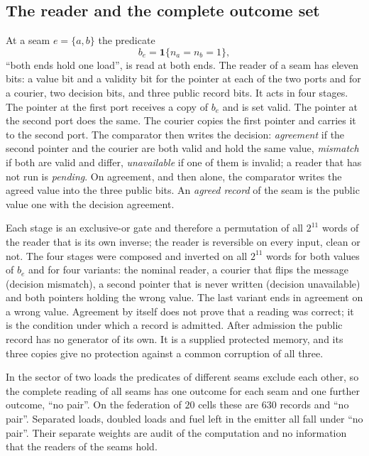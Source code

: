 \documentclass[11pt]{article}
\theoremstyle{definition}
\theoremstyle{remark}
\theoremstyle{plain}
\begin{document}
\subsection{The reader and the complete outcome set}
\label{sec:reader}

At a seam $e=\{a,b\}$ the predicate
\[
b_e=\mathbf 1\{n_a=n_b=1\},
\]
``both ends hold one load'', is read at both ends. The reader of a seam has
eleven bits: a value bit and a validity bit for the pointer at each of the
two ports and for a courier, two decision bits, and three public record
bits. It acts in four stages. The pointer at the first port receives a copy
of $b_e$ and is set valid. The pointer at the second port does the same.
The courier copies the first pointer and carries it to the second port. The
comparator then writes the decision: \emph{agreement} if the second pointer
and the courier are both valid and hold the same value, \emph{mismatch} if
both are valid and differ, \emph{unavailable} if one of them is invalid; a
reader that has not run is \emph{pending}. On agreement,
and then alone, the comparator writes the agreed value into the three
public bits. An \emph{agreed record} of the seam is the public value one
with the decision agreement.

Each stage is an exclusive-or gate and therefore a permutation of all
$2^{11}$ words of the reader that is its own inverse; the reader is
reversible on every input, clean or not. The four stages were composed and
inverted on all $2^{11}$ words for both values of $b_e$ and for four
variants: the nominal reader, a courier that flips the message (decision
mismatch), a second pointer that is never written (decision unavailable)
and both pointers holding the wrong value. The last variant ends in agreement
on a wrong value. Agreement by itself does not prove that a reading was
correct; it is the condition under which a record is admitted. After
admission the public record has no generator of its own. It is a supplied
protected memory, and its three copies give no protection against a common
corruption of all three.

In the sector of two loads the predicates of different seams exclude each
other, so the complete reading of all seams has one outcome for each seam
and one further outcome, ``no pair''. On the federation of $20$ cells these
are $630$ records and ``no pair''. Separated loads, doubled loads and fuel
left in the emitter all fall under ``no pair''. Their separate weights are
audit of the computation and no information that the readers of the seams
hold.
\end{document}

